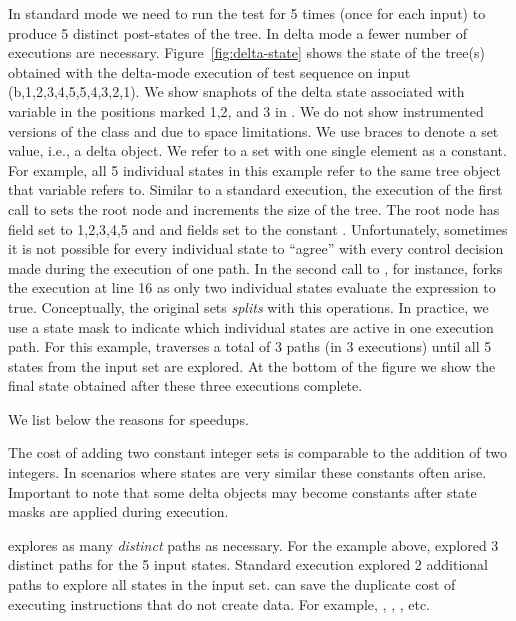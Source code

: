 \documentclass{sig-alternate}
\begin{document}
\noindent
In standard mode we need to run the test for 5 times (once for each
input) to produce 5 distinct post-states of the tree.  In delta mode a
fewer number of executions are necessary.
Figure~\ref{fig:delta-state} shows the state of the tree(s) obtained
with the delta-mode execution of test sequence  on input
(\lt{}b\gt{},\lt{}1,2,3,4,5\gt{},\lt{}5,4,3,2,1\gt{}).  We show
snaphots of the delta state associated with variable  in
the positions marked 1,2, and 3 in .  We do not show
instrumented versions of the  class and  due
to space limitations.  We use braces to denote a set value, i.e., a
delta object.  We refer to a set with one single element as a
constant.  For example, all 5 individual states in this example refer
to the same tree object that variable  refers to.  Similar
to a standard execution, the execution of the first call to
 sets the root node and increments the size of the tree.
The root node has field  set to \lt{}1,2,3,4,5\gt{} and
 and  fields set to the constant
\lt{}\gt{}.  Unfortunately, sometimes it is not possible for every
individual state to ``agree'' with every control decision made during
the execution of one path.  In the second call to , for
instance, \dE{} forks the execution at line 16 as only two individual
states evaluate the expression  to true.
Conceptually, the original sets \emph{splits} with this operations.
In practice, we use a state mask to indicate which individual states
are active in one execution path.  For this example, \DE{} traverses a
total of 3 paths (in 3 executions) until all 5 states from the input
set are explored.  At the bottom of the figure we show the final state
obtained after these three executions complete.

We list below the reasons for \dE{} speedups.

  The cost of adding two
constant integer sets is comparable to the addition of two integers.
In scenarios where states are very similar these constants often
arise.  Important to note that some delta objects may become constants
after state masks are applied during execution.

  \dE{} explores as many \emph{distinct}
paths as necessary.  For the example above, \DE{} explored 3 distinct
paths for the 5 input states.  Standard execution explored 2
additional paths to explore all states in the input set.  \dE{} can
save the duplicate cost of executing instructions that do not create
data.  For example, , , ,
etc.
\end{document}
